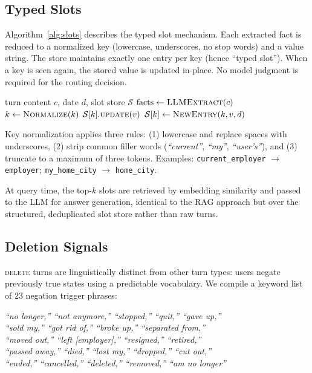 \documentclass[10pt, twocolumn]{article}
\begin{document}
\subsection{Typed Slots}
\label{sec:slots}

Algorithm~\ref{alg:slots} describes the typed slot mechanism.
Each extracted fact is reduced to a normalized key (lowercase,
underscores, no stop words) and a value string.
The store maintains exactly one entry per key (hence ``typed slot'').
When a key is seen again, the stored value is updated in-place.
No model judgment is required for the routing decision.

\begin{algorithm}[t]
\caption{Typed Slot Write}
\label{alg:slots}
\small
\begin{algorithmic}[1]
\Require turn content $c$, date $d$, slot store $\mathcal{S}$
\State $\text{facts} \leftarrow \textsc{LLMExtract}(c)$
  \State $k \leftarrow \textsc{Normalize}(k)$
    \State $\mathcal{S}[k].\textsc{update}(v)$
  \Else
    \State $\mathcal{S}[k] \leftarrow \textsc{NewEntry}(k, v, d)$
  \EndIf
\EndFor
\end{algorithmic}
\end{algorithm}

Key normalization applies three rules: (1) lowercase and replace spaces
with underscores, (2) strip common filler words
(\emph{``current''}, \emph{``my''}, \emph{``user's''}), and (3) truncate
to a maximum of three tokens.
Examples: \texttt{current\_employer} $\to$ \texttt{employer};
\texttt{my\_home\_city} $\to$ \texttt{home\_city}.

At query time, the top-$k$ slots are retrieved by embedding similarity
and passed to the LLM for answer generation, identical to the RAG approach
but over the structured, deduplicated slot store rather than raw turns.

\subsection{Deletion Signals}
\label{sec:deletion}

\textsc{delete} turns are linguistically distinct from other turn types:
users negate previously true states using a predictable vocabulary.
We compile a keyword list of 23 negation trigger phrases:

\smallskip
\noindent
\textit{``no longer,'' ``not anymore,'' ``stopped,'' ``quit,'' ``gave up,''}\\
\textit{``sold my,'' ``got rid of,'' ``broke up,'' ``separated from,''}\\
\textit{``moved out,'' ``left [employer],'' ``resigned,'' ``retired,''}\\
\textit{``passed away,'' ``died,'' ``lost my,'' ``dropped,'' ``cut out,''}\\
\textit{``ended,'' ``cancelled,'' ``deleted,'' ``removed,'' ``am no longer''}
\smallskip
\end{document}
